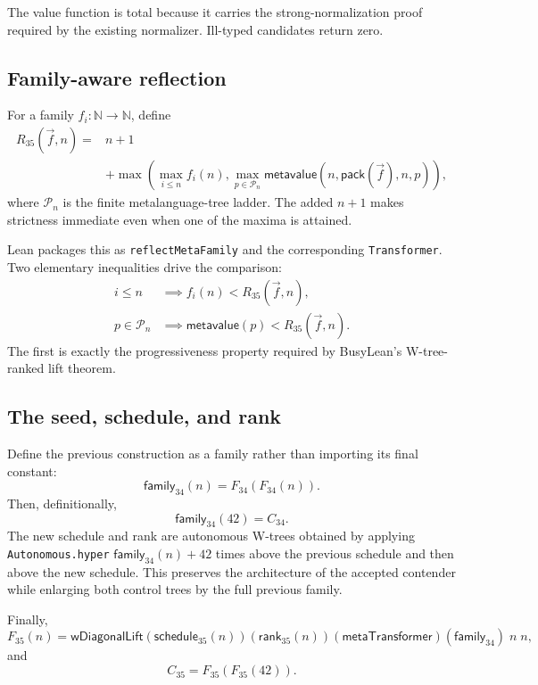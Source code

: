 \documentclass[11pt]{article}
\theoremstyle{definition}
\newcommand{\Nat}{\mathbb{N}}
\newcommand{\Fthirtyfour}{F_{34}}
\newcommand{\Fthirtyfive}{F_{35}}
\newcommand{\Cthirtyfour}{C_{34}}
\newcommand{\Cthirtyfive}{C_{35}}
\newcommand{\code}[1]{\texttt{#1}}
\begin{document}
The value function is total because it carries the strong-normalization proof
required by the existing normalizer.  Ill-typed candidates return zero.

\subsection{Family-aware reflection}

For a family \(f_i:\Nat\to\Nat\), define
\[
\begin{split}
  R_{35}(\vec f,n) ={}& n+1 \\
  &+ \max\left(
      \max_{i\le n} f_i(n),
      \max_{p\in\mathcal P_n}
        \mathsf{metavalue}(n,\mathsf{pack}(\vec f),n,p)
    \right),
\end{split}
\]
where \(\mathcal P_n\) is the finite metalanguage-tree ladder.  The added
\(n+1\) makes strictness immediate even when one of the maxima is attained.

Lean packages this as \code{reflectMetaFamily} and the corresponding
\code{Transformer}.  Two elementary inequalities drive the comparison:
\begin{align*}
  i\le n &\implies f_i(n)<R_{35}(\vec f,n),\\
  p\in\mathcal P_n &\implies
    \mathsf{metavalue}(p)<R_{35}(\vec f,n).
\end{align*}
The first is exactly the progressiveness property required by BusyLean's
W-tree-ranked lift theorem.

\subsection{The seed, schedule, and rank}

Define the previous construction as a family rather than importing its final
constant:
\[
  \mathsf{family}_{34}(n)
    = \Fthirtyfour(\Fthirtyfour(n)).
\]
Then, definitionally,
\[
  \mathsf{family}_{34}(42)=\Cthirtyfour.
\]
The new schedule and rank are autonomous W-trees obtained by applying
\code{Autonomous.hyper} \(\mathsf{family}_{34}(n)+42\) times above the previous
schedule and then above the new schedule.  This preserves the architecture of
the accepted contender while enlarging both control trees by the full previous
family.

Finally,
\[
  \Fthirtyfive(n)
  = \mathsf{wDiagonalLift}
      (\mathsf{schedule}_{35}(n))
      (\mathsf{rank}_{35}(n))
      (\mathsf{metaTransformer})
      (\mathsf{family}_{34})\;n\;n,
\]
and
\[
  \boxed{\Cthirtyfive=\Fthirtyfive(\Fthirtyfive(42)).}
\]
\end{document}
